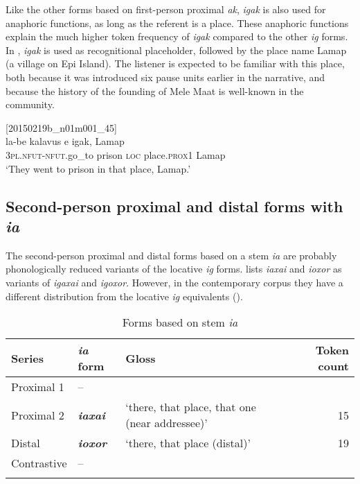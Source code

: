 \documentclass[output=paper,colorlinks,citecolor=brown]{langscibook}
\begin{document}
Like the other forms based on first-person proximal \textit{ak}, \textit{igak} is also used for anaphoric functions, as long as the referent is a place. These anaphoric functions explain the much higher token frequency of \textit{igak} compared to the other \textit{ig} forms. In , \textit{igak} is used as recognitional placeholder, followed by the place name Lamap (a village on Epi Island). The listener is expected to be familiar with this place, both because it was introduced six pause units earlier in the narrative, and because the history of the founding of Mele Maat is well-known in the community.

\ea
{\label{ex:ridge:4}[20150219b\_n01m001\_45]}\\
\gll la-be      kalavus  e  igak,    Lamap\\
     \textsc{3pl.nfut-nfut.}go\_to  prison    \textsc{loc}  place.\textsc{prox1}  Lamap\\
\glt ‘They went to prison in that place, Lamap.’
\z


\subsection{Second-person proximal and distal forms with \textit{ia}}
\label{sec:ridge:2.4}

The second-person proximal and distal forms based on a stem \textit{ia} are probably phonologically reduced variants of the locative \textit{ig} forms. \citet[8]{Parker1970} lists \textit{iaxai} and \textit{ioxor} as variants of \textit{igaxai} and \textit{igoxor}. However, in the contemporary corpus they have a different distribution from the locative \textit{ig} equivalents ().

\begin{table}
\caption{\label{tab:ridge:6}Forms based on stem \textit{ia}}
\begin{tabularx}{\textwidth}{llQr}
\lsptoprule
\textbf{Series} & \textbf{\textit{ia} form} & \textbf{Gloss} & \textbf{Token count}\\
\midrule
Proximal 1 & – &  & \\
Proximal 2 & \textbf{\textit{iaxai}} & {‘there, that place, that one (near addressee)’} & {15}\\
Distal & \textbf{\textit{ioxor}} & {‘there, that place (distal)’} & {19}\\
Contrastive & – &  & \\
\lspbottomrule
\end{tabularx}
\end{table}
\end{document}
